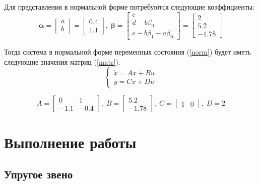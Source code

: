 	Для представления в нормальной форме потребуются следующие коэффициенты:
	\begin{equation*}
		\mathbf{\alpha} = \begin{bmatrix} a \\ b \end{bmatrix} = \begin{bmatrix} 0.4 \\ 1.1 \end{bmatrix},\;
		\mathbf{\beta} = \begin{bmatrix} c \\ d - b\beta_0 \\ e - b\beta_1 - a\beta_0 \end{bmatrix} =
		\begin{bmatrix} 2 \\ 5.2 \\ -1.78 \end{bmatrix}
	\end{equation*}

	Тогда система в нормальной форме переменных состояния (\ref{norm}) будет иметь следующие значения матриц (\ref{matr}).
	\begin{equation}
		\begin{cases}
			\dot{x} = Ax + Bu \\
			y = Cx + Du
		\end{cases}
		\label{norm}
	\end{equation}

	\begin{equation}
		A = \begin{bmatrix}
			0    & 1 \\
			-1.1 & -0.4
		\end{bmatrix},\; 
		B = \begin{bmatrix}5.2 \\ -1.78\end{bmatrix},\;
		C = \begin{bmatrix}1 & 0\end{bmatrix},\;
		D = 2
		\label{matr}
	\end{equation}

	\section{Выполнение работы}
	
	\subsection{Упругое звено}
	
